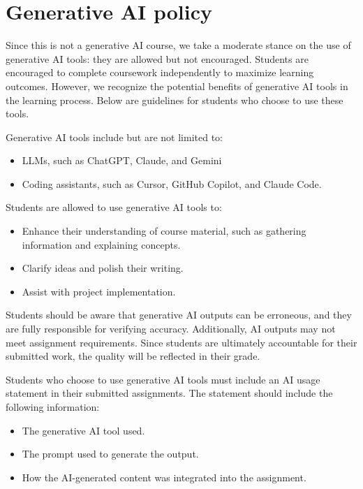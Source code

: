 \documentclass[11pt,article,oneside]{memoir} %
\begin{document}
\section{Generative AI policy}

Since this is not a generative AI course, we take a moderate stance on the use of generative AI tools: they are allowed but not encouraged.
Students are encouraged to complete coursework independently to maximize learning outcomes.
However, we recognize the potential benefits of generative AI tools in the learning process.
Below are guidelines for students who choose to use these tools.

Generative AI tools include but are not limited to:
\begin{itemize}
    \item LLMs, such as ChatGPT, Claude, and Gemini
    \item Coding assistants, such as Cursor, GitHub Copilot, and Claude Code.
\end{itemize}

Students are allowed to use generative AI tools to:

\begin{itemize}
    \item Enhance their understanding of course material, such as gathering information and explaining concepts.
    \item Clarify ideas and polish their writing.
    \item Assist with project implementation.
\end{itemize}

Students should be aware that generative AI outputs can be erroneous, and they are fully responsible for verifying accuracy.
Additionally, AI outputs may not meet assignment requirements.
Since students are ultimately accountable for their submitted work, the quality will be reflected in their grade.

Students who choose to use generative AI tools must include an AI usage statement in their submitted assignments.
The statement should include the following information:

\begin{itemize}
    \item The generative AI tool used.
    \item The prompt used to generate the output.
    \item How the AI-generated content was integrated into the assignment.
\end{itemize}
\end{document}
